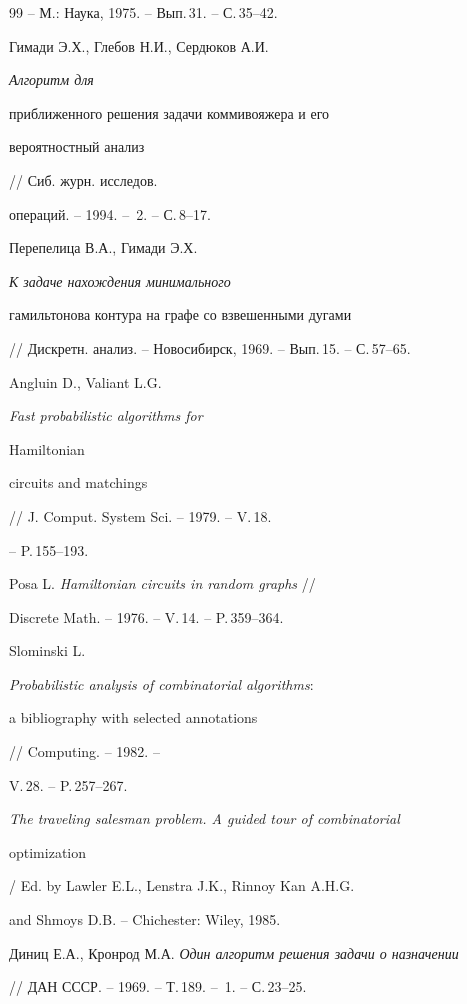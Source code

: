 \begin{thebibliography} {99}
-- М.: Наука, 1975. -- Вып.\,31. -- С.\,35--42.




Гимади Э.Х., Глебов Н.И., Сердюков А.И. {\em Алгоритм для


приближенного решения задачи коммивояжера и его


вероятностный анализ} // Сиб. журн. исследов.


операций. -- 1994. -- \No\,2. -- С.\,8--17.




Перепелица В.А., Гимади Э.Х. {\em К задаче нахождения минимального 


гамильтонова контура на графе со взвешенными дугами}


// Дискретн. анализ. -- Новосибирск, 1969. -- Вып.\,15. -- С.\,57--65.




Angluin D., Valiant L.G. {\em Fast probabilistic algorithms for 


Hamiltonian 


circuits and matchings} // J. Comput. System Sci. -- 1979. -- V.\,18.


-- P.\,155--193.




Posa L. {\em Hamiltonian circuits in random graphs} // 


Discrete Math. -- 1976. -- V.\,14. -- P.\,359--364.




Slominski L. {\em Probabilistic analysis of combinatorial algorithms$:$


a bibliography with selected annotations} // Computing. -- 1982. --


V.\,28. -- P.\,257--267.




{\em The traveling salesman problem. A guided tour of combinatorial


optimization} / Ed. by Lawler E.L., Lenstra J.K., Rinnoy Kan A.H.G.


and Shmoys D.B. -- Chichester: Wiley, 1985.




Диниц Е.А., Кронрод М.А. {\em Один алгоритм решения задачи о назначении}


// ДАН СССР. -- 1969. -- Т.\,189. -- \No\,1. -- С.\,23--25.





\end{thebibliography}





\vskip 2cm












\label{end}






